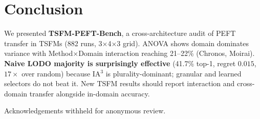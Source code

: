 \documentclass{article}
\begin{document}
\section{Conclusion}

We presented \textbf{TSFM-PEFT-Bench}, a cross-architecture audit of PEFT transfer in TSFMs (882 runs, 3$\times$4$\times$3 grid). ANOVA shows domain dominates variance with Method$\times$Domain interaction reaching 21--22\% (Chronos, Moirai). \textbf{Naive LODO majority is surprisingly effective} (41.7\% top-1, regret $0.015$, $17{\times}$ over random) because IA$^3$ is plurality-dominant; granular and learned selectors do not beat it. New TSFM results should report interaction and cross-domain transfer alongside in-domain accuracy.

\begin{ack}
Acknowledgements withheld for anonymous review.
\end{ack}




\clearpage
\appendix
\end{document}
